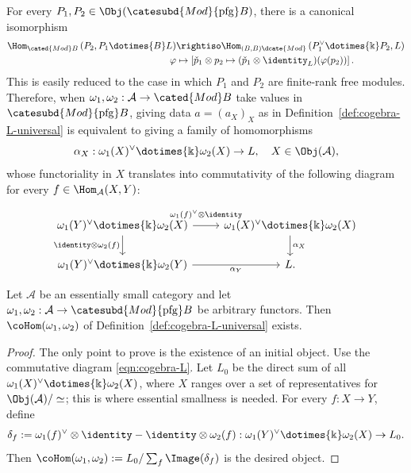 For every $P_1,P_2\in\Obj(\catesubd{Mod}{\mathrm{pfg}}B)$, there is a
canonical isomorphism
\begin{equation*}\begin{aligned}
	\Hom_{\cated{Mod}B}\left( P_2, P_1 \dotimes{B} L \right) & \rightiso \Hom_{(B, B)\dcate{Mod}}\left( P_1^\vee \dotimes{\Bbbk} P_2, L \right) \\
	\varphi & \mapsto \left[ \check{p}_1 \otimes p_2 \mapsto (\check{p}_1 \otimes \identity_L)(\varphi(p_2)) \right] .
\end{aligned}\end{equation*}
This is easily reduced to the case in which $P_1$ and $P_2$ are finite-rank
free modules. Therefore, when
$\omega_1,\omega_2:\mathcal{A}\to\cated{Mod}B$ take values in
$\catesubd{Mod}{\mathrm{pfg}}B$, giving data $a=(a_X)_X$ as in
Definition~\ref{def:cogebra-L-universal} is equivalent to giving a family of
homomorphisms
\[ \alpha_X: \omega_1(X)^\vee \dotimes{\Bbbk} \omega_2(X) \to L, \quad X \in \Obj(\mathcal{A}), \]
whose functoriality in $X$ translates into commutativity of the following
diagram for every $f\in\Hom_{\mathcal{A}}(X,Y)$:
\begin{equation}\label{eqn:cogebra-L}\begin{tikzcd}
	\omega_1(Y)^\vee \dotimes{\Bbbk} \omega_2(X) \arrow[r, "{\omega_1(f)^\vee \otimes \identity}" inner sep=0.6em] \arrow[d, "{\identity \otimes \omega_2(f)}"'] & \omega_1(X)^\vee \dotimes{\Bbbk} \omega_2(X) \arrow[d, "{\alpha_X}"] \\
	\omega_1(Y)^\vee \dotimes{\Bbbk} \omega_2(Y) \arrow[r, "{\alpha_Y}"'] & L.
\end{tikzcd}\end{equation}

\begin{proposition}\label{prop:cogebra-L-universal}
	Let $\mathcal{A}$ be an essentially small category and let
	$\omega_1,\omega_2:\mathcal{A}\to
	\catesubd{Mod}{\mathrm{pfg}}B$ be arbitrary functors. Then
	$\coHom(\omega_1,\omega_2)$ of
	Definition~\ref{def:cogebra-L-universal} exists.
\end{proposition}
\begin{proof}
	The only point to prove is the existence of an initial object. Use the
	commutative diagram \eqref{eqn:cogebra-L}. Let $L_0$ be the direct sum of
	all $\omega_1(X)^\vee\dotimes{\Bbbk}\omega_2(X)$, where $X$ ranges over a
	set of representatives for $\Obj(\mathcal{A})/\simeq$; this is where
	essential smallness is needed. For every $f:X\to Y$, define
	\[ \delta_f := \omega_1(f)^\vee \otimes \identity - \identity \otimes \omega_2(f) : \omega_1(Y)^\vee \dotimes{\Bbbk} \omega_2(X) \to L_0. \]
	Then $\coHom(\omega_1,\omega_2):=L_0/\sum_f\Image(\delta_f)$ is the
	desired object.
\end{proof}

